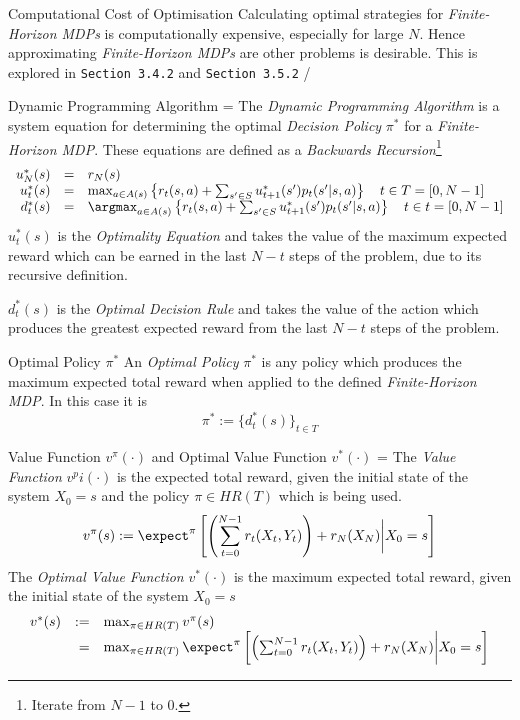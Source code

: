 \documentclass[11pt,a4paper]{article}
\begin{document}
  \begin{remark}{Computational Cost of Optimisation}
    Calculating optimal strategies for \textit{Finite-Horizon MDPs} is computationally expensive, especially for large $N$. Hence approximating \textit{Finite-Horizon MDPs} are other problems is desirable. This is explored in \texttt{Section 3.4.2} and \texttt{Section 3.5.2}  /
  \end{remark}

  \begin{remark}{Dynamic Programming Algorithm}
    \everymath={\displaystyle}
    The \textit{Dynamic Programming Algorithm} is a system equation for determining the optimal \textit{Decision Policy} $\pi^*$ for a \textit{Finite-Horizon MDP}. These equations are defined as a \textit{Backwards Recursion}\footnote{Iterate from $N-1$ to $0$.}
    \[\begin{array}{rcl}
      u^*_N(s)&=&r_N(s)\\
      u_t^*(s)&=&\max_{a\in A(s)}\left\{r_t(s,a)+\sum_{s'\in S}u_{t+1}^*(s')p_t(s'|s,a)\right\}\quad t\in T=[0,N-1]\\
      d_t^*(s)&=&\argmax_{a\in A(s)}\left\{r_t(s,a)+\sum_{s'\in S}u_{t+1}^*(s')p_t(s'|s,a)\right\}\quad t\in t=[0,N-1]\\
    \end{array}\]
    $u_t^*(s)$ is the \textit{Optimality Equation} and takes the value of the maximum expected reward which can be earned in the last $N-t$ steps of the problem, due to its recursive definition.
    \par $d_t^*(s)$ is the \textit{Optimal Decision Rule} and takes the value of the action which produces the greatest expected reward from the last $N-t$ steps of the problem.
  \end{remark}

  \begin{definition}{Optimal Policy $\pi^*$}
    An \textit{Optimal Policy} $\pi^*$ is any policy which produces the maximum expected total reward when applied to the defined \textit{Finite-Horizon MDP}. In this case it is
    \[ \pi^*:=\{d_t^*(s)\}_{t\in T} \]
  \end{definition}

  \begin{definition}{Value Function $v^\pi(\cdot)$ and Optimal Value Function $v^*(\cdot)$}
    \everymath={\displaystyle}
    The \textit{Value Function} $v^pi(\cdot)$ is the expected total reward, given the initial state of the system $X_0=s$ and the policy $\pi\in HR(T)$ which is being used.
    \[ v^\pi(s):=\expect^\pi\left[\left(\sum_{t=0}^{N-1}r_t(X_t,Y_t)\right)+r_N(X_N)\bigg|X_0=s\right] \]
    The \textit{Optimal Value Function} $v^*(\cdot)$ is the maximum expected total reward, given the initial state of the system $X_0=s$
    \[\begin{array}{rrl}
      v^*(s)&:=&\max_{\pi\in HR(T)}v^\pi(s)\\
      &=&\max_{\pi\in HR(T)}\expect^\pi\left[\left(\sum_{t=0}^{N-1}r_t(X_t,Y_t)\right)+r_N(X_N)\bigg|X_0=s\right]
    \end{array}\]
  \end{definition}
\end{document}
